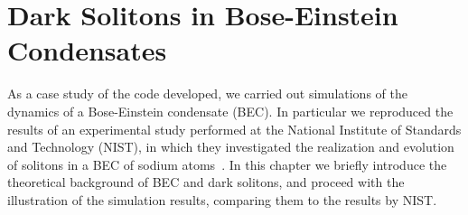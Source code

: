 \chapter{Dark Solitons in Bose-Einstein Condensates}
As a case study of the code developed, we carried out simulations of the dynamics of a Bose-Einstein condensate (BEC). In particular we reproduced the results of an experimental study performed at the National Institute of Standards and Technology (NIST), in which they investigated the realization and evolution of solitons in a BEC of sodium atoms~\citep{DSF00}. In this chapter we briefly introduce the theoretical background of BEC and dark solitons, and proceed with the illustration of the simulation results, comparing them to the results by NIST.

